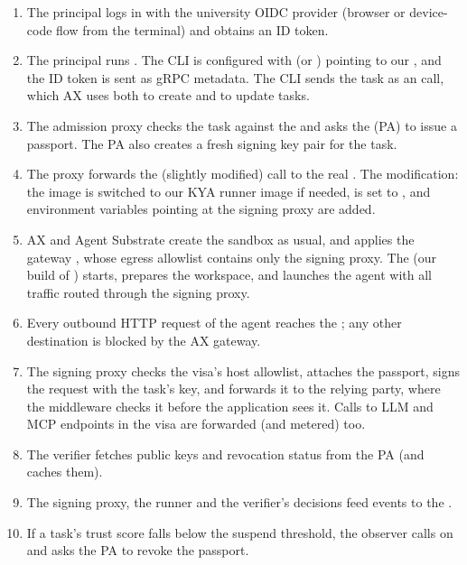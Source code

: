 \begin{enumerate}[label=\protect\circled{\arabic*},leftmargin=2em]
  \item The principal logs in with the university OIDC provider (browser or device-code flow from the terminal) and obtains an ID token.
  \item The principal runs . The CLI is configured with  (or ) pointing to our , and the ID token is sent as gRPC metadata. The CLI sends the task as an  call, which AX uses both to create and to update tasks.
  \item The admission proxy checks the task against the  and asks the  (PA) to issue a passport. The PA also creates a fresh signing key pair for the task.
  \item The proxy forwards the (slightly modified)  call to the real . The modification: the image is switched to our KYA runner image if needed,  is set to , and environment variables pointing at the signing proxy are added.
  \item AX and Agent Substrate create the sandbox as usual, and  applies the gateway , whose egress allowlist contains only the signing proxy. The  (our build of ) starts, prepares the workspace, and launches the agent with all traffic routed through the signing proxy.
  \item Every outbound HTTP request of the agent reaches the ; any other destination is blocked by the AX gateway.
  \item The signing proxy checks the visa's host allowlist, attaches the passport, signs the request with the task's key, and forwards it to the relying party, where the  middleware checks it before the application sees it. Calls to LLM and MCP endpoints in the visa are forwarded (and metered) too.
  \item The verifier fetches public keys and revocation status from the PA (and caches them).
  \item The signing proxy, the runner and the verifier's decisions feed events to the .
  \item If a task's trust score falls below the suspend threshold, the observer calls  on  and asks the PA to revoke the passport.
\end{enumerate}

